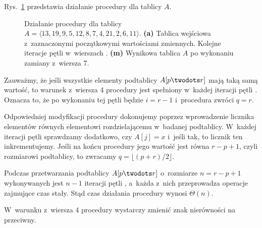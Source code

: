 
\exercise %

\noindent Rys.\ \ref{fig:7.1-1} przedstawia działanie procedury  dla tablicy $A$.
\begin{figure}[ht]
	\centering 
	\caption{Działanie procedury  dla tablicy $A=\langle13,19,9,5,12,8,7,4,21,2,6,11\rangle$.
{\sffamily\bfseries(a)} Tablica wejściowa z~zaznaczonymi początkowymi wartościami zmiennych.
{\sffamily\bfseries{}} Kolejne iteracje pętli  w~wierszach .
{\sffamily\bfseries(m)} Wynikowa tablica $A$ po wykonaniu zamiany z~wiersza 7.} \label{fig:7.1-1}
\end{figure}

\exercise %

\noindent Zauważmy, że jeśli wszystkie elementy podtablicy $A[p\twodots r]$ mają taką samą wartość, to warunek z~wiersza 4 procedury  jest spełniony w~każdej iteracji pętli .
Oznacza to, że po wykonaniu tej pętli będzie $i=r-1$ i~procedura zwróci $q=r$.

Odpowiedniej modyfikacji procedury dokonujemy poprzez wprowadzenie licznika elementów równych elementowi rozdzielającemu w~badanej podtablicy.
W~każdej iteracji pętli  sprawdzamy dodatkowo, czy $A[j]=x$ i~jeśli tak, to licznik ten inkrementujemy.
Jeśli na końcu procedury jego wartość jest równa $r-p+1$, czyli rozmiarowi podtablicy, to zwracamy $q=\lfloor(p+r)/2\rfloor$.

\exercise %
Podczas przetwarzania podtablicy $A[p\twodots r]$ o~rozmiarze $n=r-p+1$ wykonywanych jest $n-1$ iteracji pętli , a~każda z~nich przeprowadza operacje zajmujące czas stały.
Stąd czas działania procedury  wynosi $\Theta(n)$.

\exercise %
W~warunku z~wiersza 4 procedury  wystarczy zmienić znak nierówności na przeciwny.
